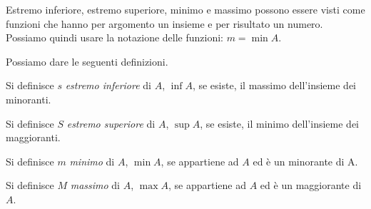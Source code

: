 \begin{newoss}{}{}
Estremo inferiore, estremo superiore, minimo e massimo possono essere visti 
come funzioni che hanno per argomento un insieme e per risultato un numero.
Possiamo quindi usare la notazione delle funzioni: \quad \(m = \min{A}\).
\end{newoss}

Possiamo dare le seguenti definizioni.

\begin{newdef}{}{}
Si definisce \(s\) \emph{estremo inferiore} di \(A\), \(\inf{A}\), se 
esiste, il massimo dell'insieme dei minoranti.
\end{newdef}

\begin{newdef}{}{}
Si definisce \(S\) \emph{estremo superiore} di \(A\), \(\sup{A}\), se 
esiste, il minimo dell'insieme dei maggioranti.
\end{newdef}

\begin{newdef}{}{}
Si definisce \(m\) \emph{minimo} di \(A\), \(\min{A}\), se 
appartiene ad \(A\) ed è un minorante di A.
\end{newdef}

\begin{newdef}{}{}
Si definisce \(M\) \emph{massimo} di \(A\), \(\max{A}\), se 
appartiene ad \(A\) ed è un maggiorante di \(A\).
\end{newdef}

